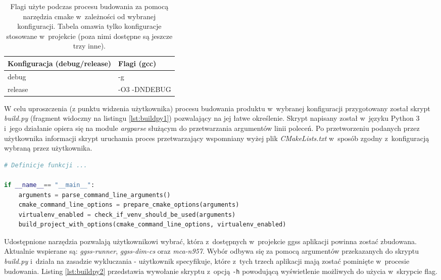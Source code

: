 \begin{table}[htbp]
\centering
\caption{Flagi użyte podczas procesu budowania za pomocą narzędzia \gls*{cmake} w~zależności od wybranej konfiguracji. Tabela omawia tylko konfiguracje stosowane w~projekcie (poza nimi dostępne są jeszcze trzy inne). \cite{CMakeOptions}}
\label{tab:cmaketypes}
\begin{tabular}{@{}ll@{}}
\toprule
Konfiguracja (debug/release) & 
Flagi (gcc)\\ 

\midrule

debug & -g \\
release & -O3 -DNDEBUG \\

\bottomrule
\end{tabular}
\end{table}

W celu uproszczenia (z punktu widzenia użytkownika) procesu budowania produktu w~wybranej konfiguracji przygotowany został skrypt \textit{build.py} (fragment widoczny na listingu \ref{lst:buildpy1}) pozwalający na jej łatwe określenie. Skrypt napisany został w~języku Python 3 i~jego działanie opiera się na module \textit{argparse} służącym do przetwarzania argumentów linii poleceń. Po przetworzeniu podanych przez użytkownika informacji skrypt uruchamia proces przetwarzający wspomniany wyżej plik \textit{CMakeLists.txt} w~sposób zgodny z~konfiguracją wybraną przez użytkownika.

\begin{lstlisting}[language=python, caption={Fragment pliku \textit{build.py} stanowiącego interfejs pozwalający na łatwe budowanie projektu \gls*{ggss} w~różnych konfiguracjach.}, label={lst:buildpy1}]
# Definicje funkcji ... 

if __name__== "__main__":
    arguments = parse_command_line_arguments()
    cmake_command_line_options = prepare_cmake_options(arguments)
    virtualenv_enabled = check_if_venv_should_be_used(arguments)
    build_project_with_options(cmake_command_line_options, virtualenv_enabled)

\end{lstlisting}

Udostępnione narzędzia pozwalają użytkownikowi wybrać, która z~dostępnych w~projekcie \gls*{ggss} aplikacji powinna zostać zbudowana. Aktualnie wspierane są: \textit{ggss-runner}, \textit{ggss-dim-cs} oraz \textit{mca-n957}. Wybór odbywa się za pomocą argumentów przekazanych do skryptu \textit{build.py} i~działa na zasadzie wykluczania - użytkownik specyfikuje, które z~tych trzech aplikacji mają zostać pominięte w~procesie budowania. Listing \ref{lst:buildpy2} przedstawia wywołanie skryptu z~opcją \lstinline{-h} powodującą wyświetlenie możliwych do użycia w~skrypcie flag. 

